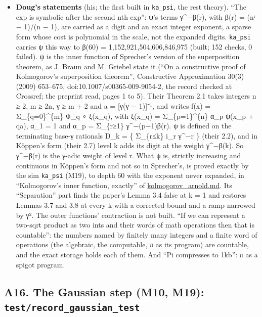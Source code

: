 \begin{itemize}
\item \textbf{Doug's statements} (his; the first built in \texttt{ka\_\allowbreak{}psi}, the rest theory). “The exp is symbolic after the second nth exp”: ψ's terms γ\textasciicircum{}−β(r), with β(r) = (nʳ − 1)/(n − 1), are carried as a digit and an exact integer exponent, a sparse form whose cost is polynomial in the scale, not the expanded digits. \texttt{ka\_\allowbreak{}psi} carries ψ this way to β(60) = 1,152,921,504,606,846,975 (built; 152 checks, 0 failed). ψ is the inner function of Sprecher's version of the superposition theorem, as J. Braun and M. Griebel state it (“On a constructive proof of Kolmogorov's superposition theorem”, Constructive Approximation 30(3) (2009) 653–675, doi:10.1007/s00365-009-9054-2, the record checked at Crossref; the preprint read, pages 1 to 5). Their Theorem 2.1 takes integers n ≥ 2, m ≥ 2n, γ ≥ m + 2 and a = [γ(γ − 1)]⁻¹, and writes f(x) = Σ\_\allowbreak{}\{q=0\}\textasciicircum{}\{m\} Φ\_\allowbreak{}q ∘ ξ(x\_\allowbreak{}q), with ξ(x\_\allowbreak{}q) = Σ\_\allowbreak{}\{p=1\}\textasciicircum{}\{n\} α\_\allowbreak{}p ψ(x\_\allowbreak{}p + qa), α\_\allowbreak{}1 = 1 and α\_\allowbreak{}p = Σ\_\allowbreak{}\{r≥1\} γ\textasciicircum{}−(p−1)β(r). ψ is defined on the terminating base-γ rationals D\_\allowbreak{}k = \{ Σ\_\allowbreak{}\{r≤k\} i\_\allowbreak{}r γ\textasciicircum{}−r \} (their 2.2), and in Köppen's form (their 2.7) level k adds its digit at the weight γ\textasciicircum{}−β(k). So γ\textasciicircum{}−β(r) is the γ-adic weight of level r. What ψ is, strictly increasing and continuous in Köppen's form and not so in Sprecher's, is proved exactly by the sim \texttt{ka\_\allowbreak{}psi} (M19), to depth 60 with the exponent never expanded, in “Kolmogorov's inner function, exactly” of \hyperref[chap:kolmogorov-arnold]{kolmogorov\_\allowbreak{}arnold.md}. Its “Separation” part finds the paper's Lemma 3.4 false at k = 1 and restores Lemmas 3.7 and 3.8 at every k with a corrected bound and a ramp narrowed by γ². The outer functions' contraction is not built. “If we can represent a two-sqrt product as two ints and their words of math operations then that is countable”: the numbers named by finitely many integers and a finite word of operations (the algebraic, the computable, π as its program) are countable, and the exact storage holds each of them. And “Pi compresses to 1kb”: π as a spigot program.
\end{itemize}

\subsection{\texorpdfstring{A16. The Gaussian step (M10, M19): \texttt{test/\allowbreak{}record\_\allowbreak{}gaussian\_\allowbreak{}test}}{A16. The Gaussian step (M10, M19): test/record\_gaussian\_test}}

